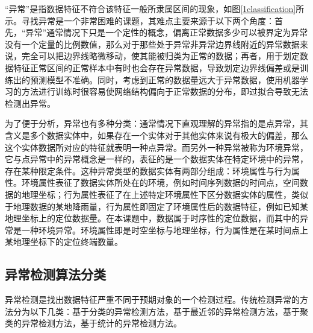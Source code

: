 \documentclass[a4paper,AutoFakeBold,oneside,12pt]{book}
\begin{document}
“异常”是指数据特征不符合该特征一般所隶属区间的现象，如图\ref{1classification}所示。寻找异常是一个非常困难的课题，其难点主要来源于以下两个角度：首先，“异常”通常情况下只是一个定性的概念，偏离正常数据多少可以被界定为异常没有一个定量的比例数值，那么对于那些处于异常非异常边界线附近的异常数据来说，完全可以把边界线略微移动，使其能被归类为正常的数据；再者，用于划定数据特征正常区间的正常样本中有时也会存在异常数据，导致划定边界线偏差或是训练出的预测模型不准确。同时，考虑到正常的数据量远大于异常数据，使用机器学习的方法进行训练时很容易使网络结构偏向于正常数据的分布，即过拟合导致无法检测出异常。


为了便于分析，异常也有多种分类：通常情况下直观理解的异常指的是点异常，其含义是多个数据实体中，如果存在一个实体对于其他实体来说有极大的偏差，那么这个实体数据所对应的特征就表明一种点异常。而另外一种异常被称为环境异常，它与点异常中的异常概念是一样的，表征的是一个数据实体在特定环境中的异常，存在某种限定条件。这种异常类型的数据实体有两部分组成：环境属性与行为属性。环境属性表征了数据实体所处在的环境，例如时间序列数据的时间点，空间数据的地理坐标；行为属性表征了在上述特定环境属性下区分数据实体的属性，类似于地理数据的某地降雨量，行为属性即固定了环境属性后的数据特征，例如已知某地理坐标上的定位数据量。在本课题中，数据属于时序性的定位数据，而其中的异常是一种环境异常。环境属性即是时空坐标与地理坐标，行为属性是在某时间点上某地理坐标下的定位终端数量。

\subsection{异常检测算法分类}

  异常检测是找出数据特征严重不同于预期对象的一个检测过程。传统检测异常的方法分为以下几类：基于分类的异常检测方法，基于最近邻的异常检测方法，基于聚类的异常检测方法，基于统计的异常检测方法。
\end{document}
